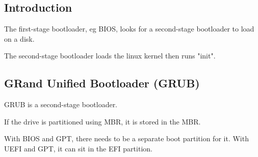 
\subsection{Introduction}

The first-stage bootloader, eg BIOS, looks for a second-stage bootloader to load on a disk.

The second-stage bootloader loads the linux kernel then runs "init".

\subsection{GRand Unified Bootloader (GRUB)}

GRUB is a second-stage bootloader.

If the drive is partitioned using MBR, it is stored in the MBR.

With BIOS and GPT, there needs to be a separate boot partition for it.
With UEFI and GPT, it can sit in the EFI partition.

